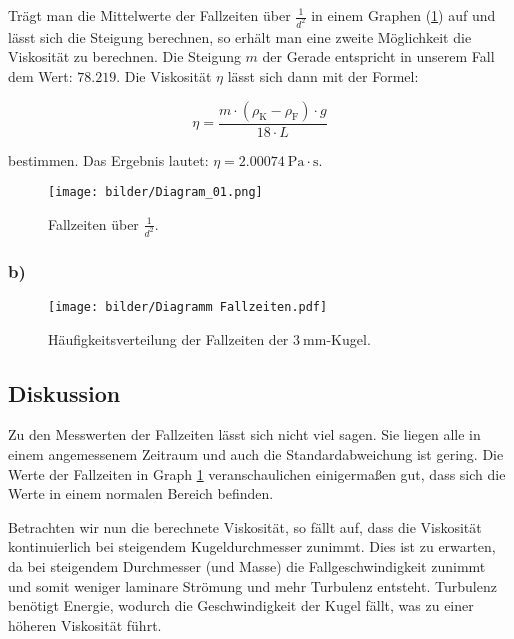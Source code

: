             Trägt man die Mittelwerte der Fallzeiten über $\frac{1}{d^{2}}$ in einem Graphen (\ref{fig:graph_01}) auf und lässt sich die Steigung berechnen, so erhält man eine zweite Möglichkeit die Viskosität zu berechnen. Die Steigung $m$ der Gerade entspricht in unserem Fall dem Wert: $78.219$. Die Viskosität $\eta$ lässt sich dann mit der Formel: 

            \begin{equation}
                \eta = \frac{m \cdot (\rho_{\mathrm{K}} - \rho_{\mathrm{F}}) \cdot g}{18 \cdot L}
            \end{equation}

            bestimmen. Das Ergebnis lautet: $\eta = 2.00074\ \mathrm{Pa \cdot s}$.

            \begin{figure}
                \centering
                \texttt{[image: bilder/Diagram\_01.png]}
                \caption{Fallzeiten über $\frac{1}{d^{2}}$.}
                \label{fig:graph_01}
            \end{figure}

            \subsubsection{b)}

            \begin{figure}[H]
                \centering
                \texttt{[image: bilder/Diagramm Fallzeiten.pdf]}
                \caption{Häufigkeitsverteilung der Fallzeiten der $3\ \mathrm{mm}$-Kugel.}
                \label{fig:graph_02}
            \end{figure}
        
        \subsection{Diskussion}

            Zu den Messwerten der Fallzeiten lässt sich nicht viel sagen. Sie liegen alle in einem angemessenem Zeitraum und auch die Standardabweichung ist gering. Die Werte der Fallzeiten in Graph \ref{fig:graph_01} veranschaulichen einigermaßen gut, dass sich die Werte in einem normalen Bereich befinden.

            Betrachten wir nun die berechnete Viskosität, so fällt auf, dass die Viskosität kontinuierlich bei steigendem Kugeldurchmesser zunimmt. Dies ist zu erwarten, da bei steigendem Durchmesser (und Masse) die Fallgeschwindigkeit zunimmt und somit weniger laminare Strömung und mehr Turbulenz entsteht. Turbulenz benötigt Energie, wodurch die Geschwindigkeit der Kugel fällt, was zu einer höheren Viskosität führt.

